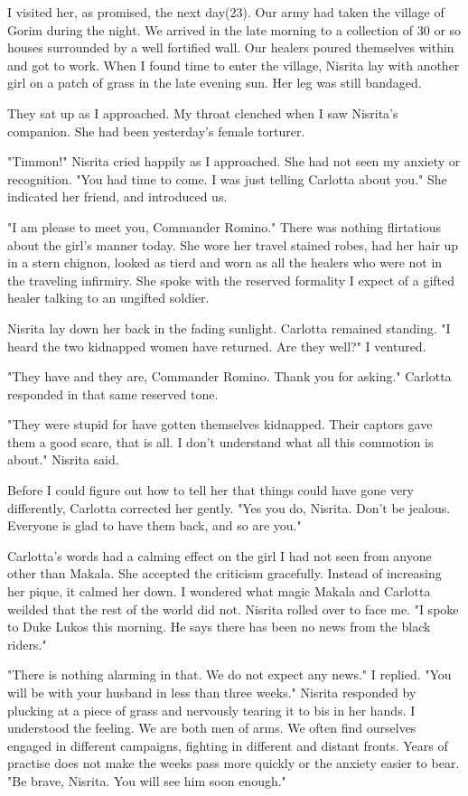\documentclass{article}
\begin{document}
I visited her, as promised, the next day(23). Our army had taken the village of Gorim during the night. We arrived in the late morning to a collection of 30 or so houses surrounded by a well fortified wall. Our healers poured themselves within and got to work. When I found time to enter the village, Nisrita lay with another girl on a patch of grass in the late evening sun. Her leg was still bandaged.

They sat up as I approached. My throat clenched when I saw Nisrita's companion. She had been yesterday's female torturer.

"Timmon!" Nisrita cried happily as I approached. She had not seen my anxiety or recognition. "You had time to come. I was just telling Carlotta about you." She indicated her friend, and introduced us.

"I am please to meet you, Commander Romino." There was nothing flirtatious about the girl's manner today. She wore her travel stained robes, had her hair up in a stern chignon, looked as tierd and worn as all the healers who were not in the traveling infirmiry. She spoke with the reserved formality I expect of a gifted healer talking to an ungifted soldier.

Nisrita lay down her back in the fading sunlight. Carlotta remained standing. "I heard the two kidnapped women have returned. Are they well?" I ventured.

"They have and they are, Commander Romino. Thank you for asking." Carlotta responded in that same reserved tone.

"They were stupid for have gotten themselves kidnapped. Their captors gave them a good scare, that is all. I don't understand what all this commotion is about." Nisrita said.

Before I could figure out how to tell her that things could have gone very differently, Carlotta corrected her gently. "Yes you do, Nisrita. Don't be jealous. Everyone is glad to have them back, and so are you."

Carlotta's words had a calming effect on the girl I had not seen from anyone other than Makala. She accepted the criticism gracefully. Instead of  increasing her pique, it calmed her down. I wondered what magic Makala and Carlotta weilded that the rest of the world did not. Nisrita rolled over to face me. "I spoke to Duke Lukos this morning. He says there has been no news from the black riders."

"There is nothing alarming in that. We do not expect any news." I replied. "You will be with your husband in less than three weeks." Nisrita responded by plucking at a piece of grass and nervously tearing it to bis in her hands. I understood the feeling. We are both men of arms. We often find ourselves engaged in different campaigns, fighting in different and distant fronts. Years of practise does not make the weeks pass more quickly or the anxiety easier to bear. "Be brave, Nisrita. You will see him soon enough." 
\end{document}
